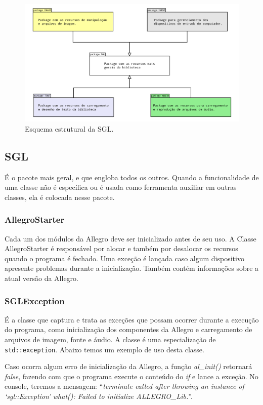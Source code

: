 \begin{figure}[H]
    \centering
		\caption{Esquema estrutural da SGL. }
    \label{pacotes}
    \includegraphics[scale = 0.2]{Imagens/pacotes.png}
\end{figure}
%
%
%
\subsection{SGL}
%
%
É o pacote mais geral, e que engloba todos os outros. Quando a funcionalidade de uma classe não é específica ou é usada como ferramenta auxiliar em outras classes, ela é colocada nesse pacote.
%
\subsubsection{AllegroStarter}
%
Cada um dos módulos da Allegro deve ser inicializado antes de seu uso. A Classe AllegroStarter é responsável por alocar e também por desalocar os recursos quando o programa é fechado. Uma exceção é lançada caso algum dispositivo apresente problemas durante a inicialização. Também contém informações sobre a atual versão da Allegro. 
%
%
\subsubsection{SGLException}
%
É a classe que captura e trata as exceções que possam ocorrer durante a execução do programa, como inicialização dos componentes da Allegro e carregamento de arquivos de imagem, fonte e áudio. A classe é uma especialização de \texttt{std::exception}. Abaixo temos um exemplo de uso desta classe.
%

%
\par 
Caso ocorra algum erro de inicialização da Allegro, a função \textit{al\_init()} retornará \textit{false}, fazendo com que o programa execute o conteúdo do \textit{if} e lance a exceção. No console, teremos a mensagem:  ``\textit{terminate called after throwing an instance of `sgl::Exception'
what(): Failed to initialize ALLEGRO\_Lib.}''.
%
%

